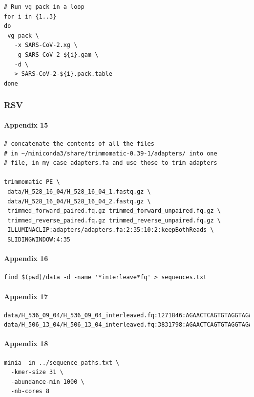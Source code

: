 \documentclass[10pt, a4paper]{article}
\begin{document}
\begin{appendices}
\begin{verbatim}
# Run vg pack in a loop
for i in {1..3}
do 
 vg pack \
   -x SARS-CoV-2.xg \
   -g SARS-CoV-2-${i}.gam \
   -d \
   > SARS-CoV-2-${i}.pack.table
done
\end{verbatim}

\subsubsection{RSV}
\label{sec:org24e0307}
\paragraph{Appendix 15}
\label{sec:org290e7cb}
\begin{verbatim}
# concatenate the contents of all the files
# in ~/miniconda3/share/trimmomatic-0.39-1/adapters/ into one
# file, in my case adapters.fa and use those to trim adapters

trimmomatic PE \
 data/H_528_16_04/H_528_16_04_1.fastq.gz \
 data/H_528_16_04/H_528_16_04_2.fastq.gz \
 trimmed_forward_paired.fq.gz trimmed_forward_unpaired.fq.gz \
 trimmed_reverse_paired.fq.gz trimmed_reverse_unpaired.fq.gz \
 ILLUMINACLIP:adapters/adapters.fa:2:35:10:2:keepBothReads \
 SLIDINGWINDOW:4:35
\end{verbatim}

\paragraph{Appendix 16}
\label{sec:org4698a6b}
\begin{verbatim}
find $(pwd)/data -d -name '*interleave*fq' > sequences.txt
\end{verbatim}

\paragraph{Appendix 17}
\label{sec:orgd76ee0b}
\begin{verbatim}
data/H_536_09_04/H_536_09_04_interleaved.fq:1271846:AGAACTCAGTGTAGGTAGAATGGTTGGCTGATCAATATCTCTAATGATTTTGGTCTGTGAATCAACTGTCATAAGAGAATTCTATCAAAGTTGAATTCCGAATCCTTGGGTCAATGACTGGGTGCACCCATTCTTCTAATGTGCTCTGTC
data/H_506_13_04/H_506_13_04_interleaved.fq:3831798:AGAACTCAGTGTAGGTAGAATGGTTGGCTGAGTAGGTAGATGGAGGCAGGTGCATGTGTGATGGGAAGTGTGGTGACGGGTTGTGTGGGCACACGGGATGAGGCGCAGATGGCTGGGGGTTTGGGAGGGGAATGGGTGGGAGAAGGAGGC
\end{verbatim}

\paragraph{Appendix 18}
\label{sec:org4f68a24}
\begin{verbatim}
minia -in ../sequence_paths.txt \
  -kmer-size 31 \
  -abundance-min 1000 \
  -nb-cores 8
\end{verbatim}


\end{appendices}
\end{document}
